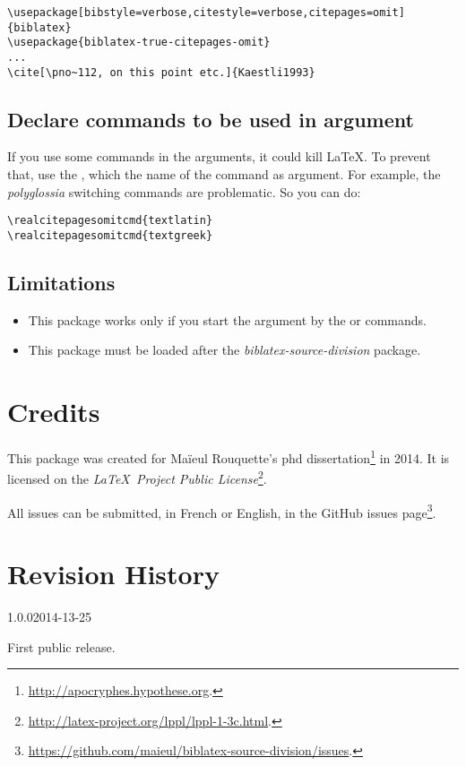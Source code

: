 \documentclass{ltxdockit}[2011/03/25]
\begin{document}
\begin{verbatim}
\usepackage[bibstyle=verbose,citestyle=verbose,citepages=omit]{biblatex}
\usepackage{biblatex-true-citepages-omit}
...
\cite[\pno~112, on this point etc.]{Kaestli1993}
\end{verbatim}


\citereset
{}
\begin{quotation}
\cite[\pno~112, on this point etc.]{Kaestli1993}
\end{quotation}
\subsection{Declare commands to be used in  argument}

If you use some commands in the  arguments, it could kill \LaTeX. To prevent that, use the , which the name of the command as argument. For example, the \emph{polyglossia} switching commands are problematic. So you can do:
\begin{verbatim}
\realcitepagesomitcmd{textlatin}
\realcitepagesomitcmd{textgreek}
\end{verbatim}
\subsection{Limitations}

\begin{itemize}
	\item This package works only if you start the    argument by the  or  commands.
	\item This package must be loaded after the \emph{biblatex-source-division} package.
\end{itemize}
\section{Credits}

This package was created for Maïeul Rouquette's phd dissertation\footnote{\url{http://apocryphes.hypothese.org}.} in 2014. It is licensed on the \emph{\LaTeX\ Project Public License}\footnote{\url{http://latex-project.org/lppl/lppl-1-3c.html}.}. 


All issues can be submitted, in French or English, in the GitHub issues page\footnote{\url{https://github.com/maieul/biblatex-source-division/issues}.}.



\section{Revision History}
\begin{changelog}




\begin{release}{1.0.0}{2014-13-25}
\item First public release.
\end{release}

\end{changelog}
\end{document}
